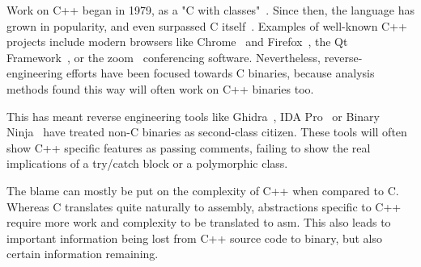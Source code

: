 \documentclass[a4paper,11pt,oneside]{report}
\begin{document}




Work on C++ began in 1979, as a "C with classes"~\cite{cwithclasses}.
Since then, the language has grown in popularity, and even surpassed C 
itself~\cite{stackoverflowpopularity}.
Examples of well-known C++ projects include modern browsers like 
Chrome~\cite{chrome} and Firefox~\cite{firefox}, the Qt Framework~\cite{qt}, or 
the zoom~\cite{zoom} conferencing software.
Nevertheless, reverse-engineering efforts have been focused towards C binaries, 
because analysis methods found this way will often work on C++ binaries too.



This has meant reverse engineering tools like Ghidra~\cite{ghidra}, IDA 
Pro~\cite{ida} or Binary Ninja~\cite{binja} have treated non-C binaries as 
second-class citizen.
These tools will often show C++ specific features as passing comments, failing 
to show the real implications of a try/catch block or a polymorphic class.


The blame can mostly be put on the complexity of C++ when compared to C.
Whereas C translates quite naturally to assembly, abstractions specific to C++ 
require more work and complexity to be translated to asm.
This also leads to important information being lost from C++ source code to 
binary, but also certain information remaining.
\end{document}
